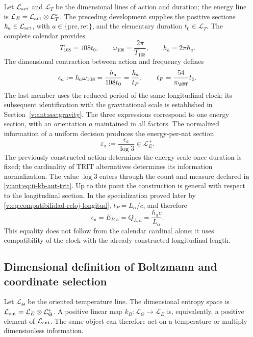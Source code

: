 Let \(\mathcal L_{\rm act}\) and \(\mathcal L_T\) be the dimensional
lines of action and duration; the energy line is
\(\mathcal L_E=\mathcal L_{\rm act}\otimes\mathcal L_T^*\).
The preceding development supplies the positive sections
\(\hbar_a\in\mathcal L_{\rm act}\), with
\(a\in\{\mathrm{pre},\mathrm{ret}\}\), and the elementary duration
\(t_0\in\mathcal L_T\). The complete calendar provides
\[
 T_{108}=108t_0,\qquad
 \omega_{108}=\frac{2\pi}{T_{108}},\qquad
 h_a=2\pi\hbar_a.
\]
The dimensional contraction between action and frequency defines
\begin{equation}
 \epsilon_a:=\hbar_a\omega_{108}
 =\frac{h_a}{108t_0}
 =\frac{\hbar_a}{t_P},\qquad
 t_P=\frac{54}{\pi_{\HMT}}t_0.
 \label{v:ant:eq:ii-kb-aut-energia}
\end{equation}
The last member uses the reduced period of the same longitudinal clock;
its subsequent identification with the gravitational scale is established
in Section~\ref{v:ant:sec:gravity}. The three expressions correspond to one
energy section, with an orientation \(a\) maintained in all
factors. The normalized information of a uniform decision
produces the energy-per-nat section
\begin{equation}
 \varepsilon_a:=\frac{\epsilon_a}{\log3}\in\mathcal L_E^+.
 \label{v:ant:eq:ii-kb-aut-energia-nat}
\end{equation}
The previously constructed action determines the energy scale once
duration is fixed; the cardinality of TRIT alternatives determines its
information normalization. The value \(\log3\) enters through the
count and measure declared in \eqref{v:ant:eq:ii-kb-aut-trit}.
Up to this point the construction is general with respect to the
longitudinal section. In the specialization proved later by
\eqref{v:eq:compatibilidad-reloj-longitud},
\(t_P=L_\alpha/c\), and therefore
\begin{equation}
 \epsilon_a=E_{P,a}=Q_{L,a}
 =\frac{\hbar_ac}{L_\alpha}.
 \label{v:eq:especializacion-termica-longitudinal}
\end{equation}
This equality does not follow from the calendar cardinal alone: it uses
compatibility of the clock with the already constructed longitudinal length.

\subsection{Dimensional definition of Boltzmann and coordinate selection}

Let \(\mathcal L_\Theta\) be the oriented temperature line.
The dimensional entropy space is
\(\mathcal L_{\rm ent}=\mathcal L_E\otimes\mathcal L_\Theta^*\).
A positive linear map
\(k_B:\mathcal L_\Theta\to\mathcal L_E\) is, equivalently,
a positive element of \(\mathcal L_{\rm ent}\). The same
object can therefore act on a temperature or multiply dimensionless
information.

